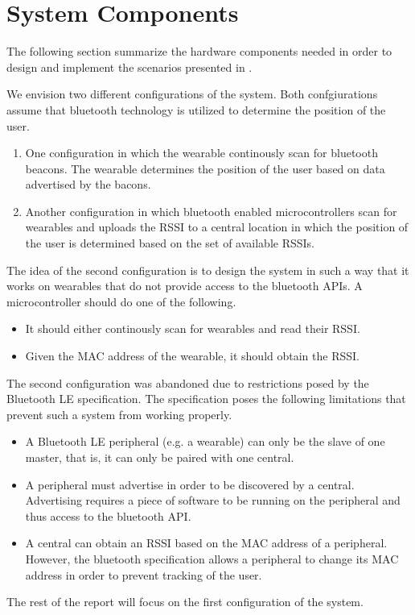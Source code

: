 \section{System Components}
\label{sec:analysis:system-components}

The following section summarize the hardware components needed in order to design and implement the scenarios presented in .

We envision two different configurations of the system. Both confgiurations assume that bluetooth technology is utilized to determine the position of the user. 

\begin{enumerate}
\item One configuration in which the wearable continously scan for bluetooth beacons. The wearable determines the position of the user based on data advertised by the bacons.
\item Another configuration in which bluetooth enabled microcontrollers scan for wearables and uploads the RSSI to a central location in which the position of the user is determined based on the set of available RSSIs.
\end{enumerate}

The idea of the second configuration is to design the system in such a way that it works on wearables that do not provide access to the bluetooth APIs. A microcontroller should do one of the following.

\begin{itemize}
\item It should either continously scan for wearables and read their RSSI.
\item Given the MAC address of the wearable, it should obtain the RSSI.
\end{itemize}

The second configuration was abandoned due to restrictions posed by the Bluetooth LE specification. The specification poses the following limitations that prevent such a system from working properly.

\begin{itemize}
\item A Bluetooth LE peripheral (e.g. a wearable) can only be the slave of one master, that is, it can only be paired with one central.
\item A peripheral must advertise in order to be discovered by a central. Advertising requires a piece of software to be running on the peripheral and thus access to the bluetooth API.
\item A central can obtain an RSSI based on the MAC address of a peripheral. However, the bluetooth specification allows a peripheral to change its MAC address in order to prevent tracking of the user.
\end{itemize}


The rest of the report will focus on the first configuration of the system.

